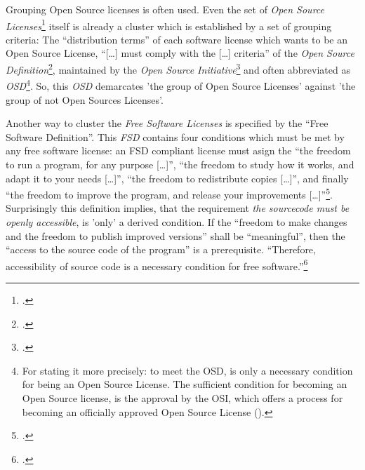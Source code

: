 %
%
%
%
%



Grouping Open Source licenses is often used. Even the set of \emph{Open Source
Li\-cen\-ses}\footcite[cf.][\nopage wp]{OSI2012b} itself is already a cluster
which is established by a set of grouping criteria: The \enquote{distribution
terms} of each software license which wants to be an Open Source License,
\enquote{[\ldots] must comply with the [\ldots] criteria} of the \emph{Open
Source Definition}\footcite[cf.][\nopage wp]{OSI2012a}, maintained by the
\emph{Open Source Initiative}\footcite[cf.][\nopage wp]{OSI2012c} and often
abbreviated as \emph{OSD}\footnote{For stating it more precisely: to meet the
OSD, is only a necessary condition for being an Open Source License. The
sufficient condition for becoming an Open Source license, is the approval by the
OSI, which offers a process for becoming an officially approved Open Source
License (\cite[cf.][\nopage wp.]{OSI2012d}).}. So, this \emph{OSD} demarcates
'the group of Open Source Licenses' against 'the group of not Open Sources
Licenses'.

Another way to cluster the \emph{Free Software Licenses} is specified by the
\enquote{Free Software Definition}. This \emph{FSD} contains four conditions
which must be met by any free software license: an FSD compliant license must
asign the \enquote{the freedom to run a program, for any purpose [\ldots]},
\enquote{the freedom to study how it works, and adapt it to your needs
[\ldots]}, \enquote{the freedom to redistribute copies [\ldots]}, and finally
\enquote{the freedom to improve the program, and release your improvements
[\ldots]}\footcite[cf.][41]{Stallman1996a}. Surprisingly this definition
implies, that the requirement \emph{the sourcecode must be openly accessible},
is 'only' a derived condition. If the \enquote{freedom to make changes and the
freedom to publish improved versions} shall be \enquote{meaningful}, then the
\enquote{access to the source code of the program} is a prerequisite.
\enquote{Therefore, accessibility of source code is a necessary condition for
free software.}\footcite[cf.][41]{Stallman1996a}

